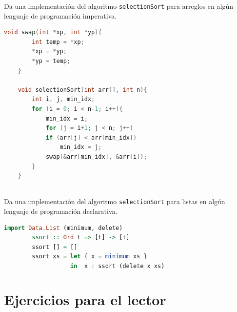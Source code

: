     \bigskip



    \bigskip
    \bigskip

    \begin{exercise}
        Da una implementación del algoritmo \texttt{selectionSort} para arreglos en algún lenguaje de programación imperativa.

	\begin{lstlisting}[language=C++]
	void swap(int *xp, int *yp){
	    int temp = *xp;
	    *xp = *yp;
	    *yp = temp;
	}
	 
	void selectionSort(int arr[], int n){
	    int i, j, min_idx;
	    for (i = 0; i < n-1; i++){
	        min_idx = i;
	        for (j = i+1; j < n; j++)
	        if (arr[j] < arr[min_idx])
	            min_idx = j;
	        swap(&arr[min_idx], &arr[i]);
	    }
	}
	 
	\end{lstlisting}
    \end{exercise}

    \begin{exercise}
        Da una implementación del algoritmo \texttt{selectionSort} para listas en algún lenguaje de programación declarativa.
	\begin{lstlisting}[language=Haskell] import Data.List (minimum, delete)
		ssort :: Ord t => [t] -> [t]
		ssort [] = []
		ssort xs = let { x = minimum xs } 
		           in  x : ssort (delete x xs)
	\end{lstlisting}
    \end{exercise}


\section{Ejercicios para el lector}

